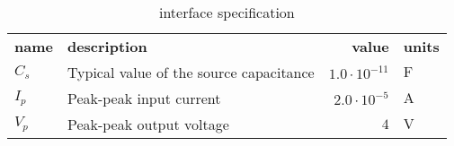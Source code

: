 \begin{table}[H]
\centering
\begin{tabular}[c]{llrl}
\textbf{name} & \textbf{description} & \textbf{value} & \textbf{units} \\ 
\rowcolor{myyellow}
$C_{s}$ &\small{Typical value of the source capacitance} &$1.0 \cdot 10^{-11}$ &$\mathrm{F}$ \\ 
$I_{p}$ &\small{Peak-peak input current} &$2.0 \cdot 10^{-5}$ &$\mathrm{A}$ \\ 
\rowcolor{myyellow}
$V_{p}$ &\small{Peak-peak output voltage} &$4$ &$\mathrm{V}$ \\ 
\end{tabular}
\caption{interface specification}
\label{specs-interface}
\end{table}



